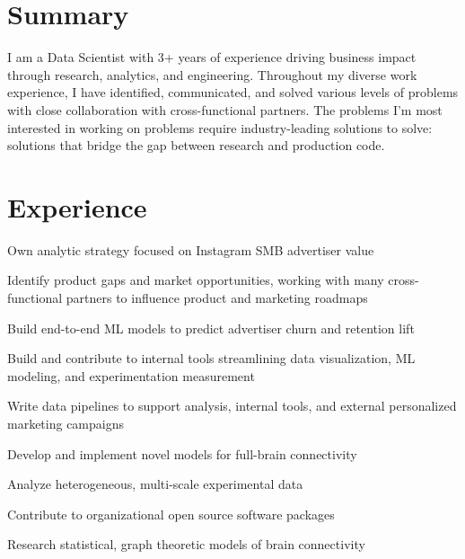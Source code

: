 \documentclass[]{deedy-resume-openfont}
\begin{document}
\hfill
\begin{minipage}[t]{0.63\textwidth}

\section{Summary}
I am a Data Scientist with 3+ years of experience driving business impact through
research, analytics, and engineering. Throughout my diverse work experience, I have identified,
communicated, and solved various levels of problems with close collaboration with
cross-functional partners. The problems I'm most interested in working on problems
require industry-leading solutions to solve: solutions that bridge the gap between
research and production code.
\sectionsep




\section{Experience}
\vspace{\topsep}
\begin{tightemize}
\item {Own analytic strategy focused on Instagram SMB advertiser value}
\item {Identify product gaps and market opportunities, working with many cross-functional
	partners to influence product and marketing roadmaps}
\item {Build end-to-end ML models to predict advertiser churn and retention lift}
\item {Build and contribute to internal tools streamlining data visualization, ML modeling, and experimentation measurement}
\item {Write data pipelines to support analysis, internal tools, and external personalized marketing campaigns}
\end{tightemize}
\sectionsep

\vspace{\topsep}
\begin{tightemize}
\item {Develop and implement novel models for full-brain connectivity}
\item {Analyze heterogeneous, multi-scale experimental data}
\item {Contribute to organizational open source software packages}
\item {Research statistical, graph theoretic models of brain connectivity}
\end{tightemize}
\sectionsep


\end{minipage}
\end{document}
